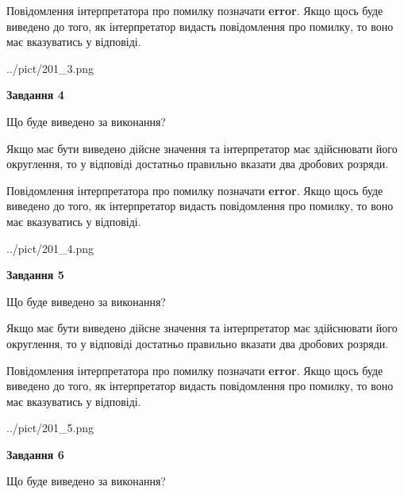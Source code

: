 \documentclass[12pt, ukrainian]{article}
\begin{document}
{\begin {Large}
Повідомлення інтерпретатора про помилку позначати \textbf{error}.
Якщо щось буде виведено до того, як інтерпретатор видасть повідомлення про помилку, 
то воно має вказуватись у відповіді. \par

\begin{center}
	{../pict/201_3.png}
\end{center}
\newpage

{\begin {center}\textbf{Завдання 4}\end {center}}\par
Що буде виведено за виконання? \par

Якщо має бути виведено дійсне значення та інтерпретатор має здійснювати його округлення, 
то у відповіді достатньо правильно вказати два дробових розряди.

Повідомлення інтерпретатора про помилку позначати \textbf{error}.
Якщо щось буде виведено до того, як інтерпретатор видасть повідомлення про помилку, 
то воно має вказуватись у відповіді. \par

\begin{center}
	{../pict/201_4.png}
\end{center}
\newpage

{\begin {center}\textbf{Завдання 5}\end {center}}\par
Що буде виведено за виконання? \par

Якщо має бути виведено дійсне значення та інтерпретатор має здійснювати його округлення, 
то у відповіді достатньо правильно вказати два дробових розряди.

Повідомлення інтерпретатора про помилку позначати \textbf{error}.
Якщо щось буде виведено до того, як інтерпретатор видасть повідомлення про помилку, 
то воно має вказуватись у відповіді. \par

\begin{center}
	{../pict/201_5.png}
\end{center}
\newpage

{\begin {center}\textbf{Завдання 6}\end {center}}\par
Що буде виведено за виконання? \par


\end{Large}}
\end{document}
